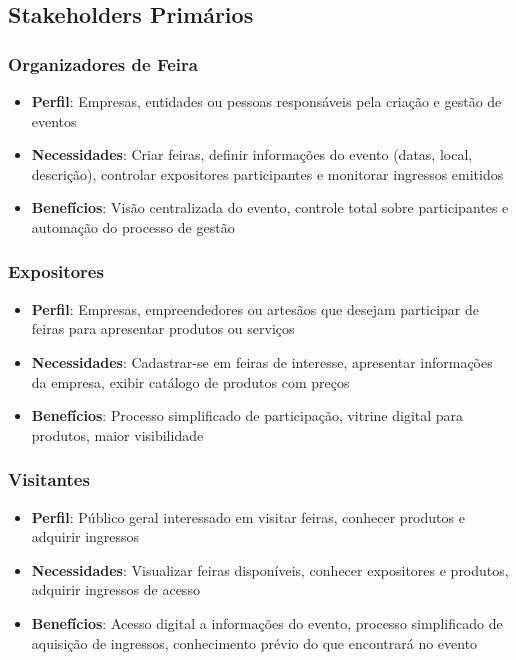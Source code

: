 \documentclass[12pt,a4paper]{article}
\begin{document}
\subsection{Stakeholders Primários}

\subsubsection{Organizadores de Feira}
\begin{itemize}
    \item \textbf{Perfil}: Empresas, entidades ou pessoas responsáveis pela criação e gestão de eventos
    \item \textbf{Necessidades}: Criar feiras, definir informações do evento (datas, local, descrição), controlar expositores participantes e monitorar ingressos emitidos
    \item \textbf{Benefícios}: Visão centralizada do evento, controle total sobre participantes e automação do processo de gestão
\end{itemize}

\subsubsection{Expositores}
\begin{itemize}
    \item \textbf{Perfil}: Empresas, empreendedores ou artesãos que desejam participar de feiras para apresentar produtos ou serviços
    \item \textbf{Necessidades}: Cadastrar-se em feiras de interesse, apresentar informações da empresa, exibir catálogo de produtos com preços
    \item \textbf{Benefícios}: Processo simplificado de participação, vitrine digital para produtos, maior visibilidade
\end{itemize}

\subsubsection{Visitantes}
\begin{itemize}
    \item \textbf{Perfil}: Público geral interessado em visitar feiras, conhecer produtos e adquirir ingressos
    \item \textbf{Necessidades}: Visualizar feiras disponíveis, conhecer expositores e produtos, adquirir ingressos de acesso
    \item \textbf{Benefícios}: Acesso digital a informações do evento, processo simplificado de aquisição de ingressos, conhecimento prévio do que encontrará no evento
\end{itemize}
\end{document}
